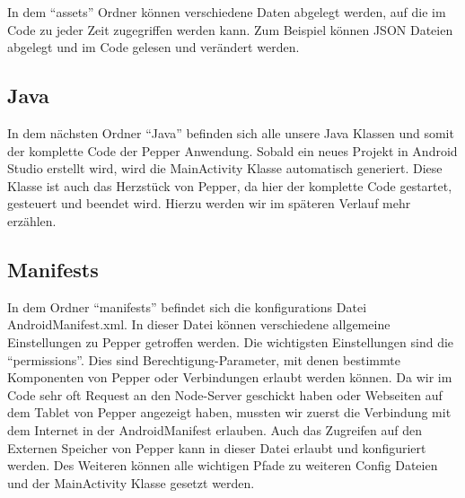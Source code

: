 In dem ``assets'' Ordner können verschiedene Daten abgelegt werden, auf die im Code zu jeder Zeit zugegriffen werden kann. 
Zum Beispiel können JSON Dateien abgelegt und im Code gelesen und verändert werden.

\subsection{Java}
In dem nächsten Ordner ``Java'' befinden sich alle unsere Java Klassen und somit der komplette Code der Pepper Anwendung. Sobald ein 
neues Projekt in Android Studio erstellt wird, wird die MainActivity Klasse automatisch generiert. Diese Klasse ist auch das Herzstück 
von Pepper, da hier der komplette Code gestartet, gesteuert und beendet wird. Hierzu werden wir im späteren Verlauf mehr erzählen.

\subsection{Manifests}
In dem Ordner ``manifests'' befindet sich die konfigurations Datei AndroidManifest.xml. In dieser Datei können verschiedene allgemeine 
Einstellungen zu Pepper getroffen werden. Die wichtigsten Einstellungen sind die ``permissions''. Dies sind Berechtigung-Parameter, mit 
denen bestimmte Komponenten von Pepper oder Verbindungen erlaubt werden können. Da wir im Code sehr oft Request an den Node-Server 
geschickt haben oder Webseiten auf dem Tablet von Pepper angezeigt haben, mussten wir zuerst die Verbindung mit dem Internet in der 
AndroidManifest erlauben. Auch das Zugreifen auf den Externen Speicher von Pepper kann in dieser Datei erlaubt und konfiguriert werden. 
Des Weiteren können alle wichtigen Pfade zu weiteren Config Dateien und der MainActivity Klasse gesetzt werden.

